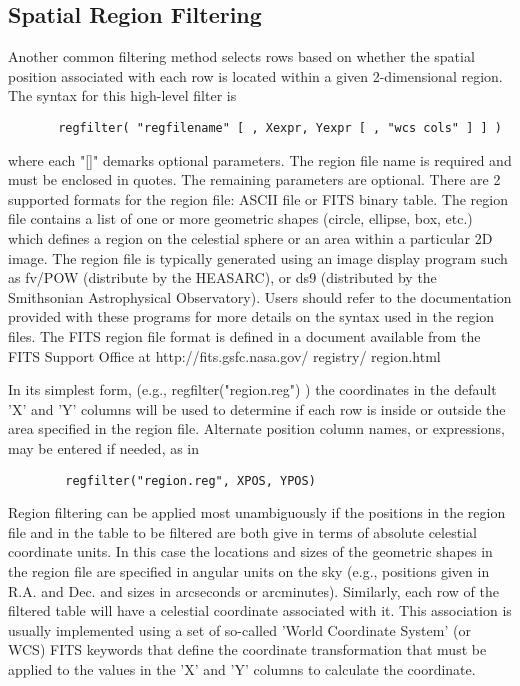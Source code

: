 \documentclass[11pt]{book}
\begin{document}
\subsection{Spatial Region Filtering}

    Another common  filtering method selects rows based on whether the
    spatial position associated with each row is located within a given
    2-dimensional region.  The syntax for this high-level filter is

\begin{verbatim}
       regfilter( "regfilename" [ , Xexpr, Yexpr [ , "wcs cols" ] ] )
\end{verbatim}
    where each "[]" demarks optional parameters. The region file name
    is required and must be  enclosed in quotes.  The remaining
    parameters are optional.  There are 2 supported formats for the
    region file: ASCII file or FITS binary table.  The region file
    contains a list of one or more geometric shapes (circle,
    ellipse, box, etc.) which defines a region on the celestial sphere
    or an area within a particular 2D image.  The region file is
    typically generated using an image display program such as fv/POW
    (distribute by the HEASARC), or ds9 (distributed by the Smithsonian
    Astrophysical Observatory).  Users should refer to the documentation
    provided with these programs for more details on the syntax used in
    the region files.  The FITS region file format is defined in a document
    available from the FITS Support Office at
    http://fits.gsfc.nasa.gov/ registry/ region.html

    In its simplest form, (e.g., regfilter("region.reg") ) the
    coordinates in the default 'X' and 'Y' columns will be used to
    determine if each row is inside or outside the area specified in
    the region file.  Alternate position column names, or expressions,
    may be entered if needed, as in

\begin{verbatim}
        regfilter("region.reg", XPOS, YPOS)
\end{verbatim}
    Region filtering can be applied most unambiguously if the positions
    in the region file and in the table to be filtered are both give in
    terms of absolute celestial coordinate units.  In this case the
    locations and sizes of the geometric shapes in the region file are
    specified in angular units on the sky (e.g., positions given in
    R.A. and Dec.  and sizes in arcseconds or arcminutes).  Similarly,
    each row of the filtered table will have a celestial coordinate
    associated with it.  This association is usually implemented using
    a set of so-called 'World Coordinate System' (or WCS) FITS keywords
    that define the coordinate transformation that must be applied to
    the values in the 'X' and 'Y' columns to calculate the coordinate.
\end{document}
